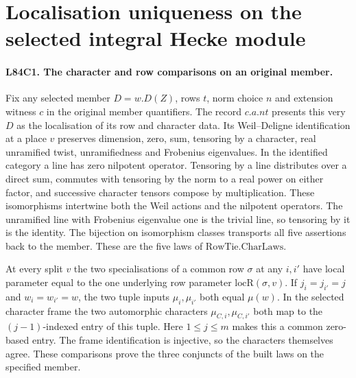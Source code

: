 \section{Localisation uniqueness on the selected integral Hecke module}

\paragraph{L84C1. The character and row comparisons on an original member.}
Fix any selected member $D=w.D(Z)$, rows $t$, norm choice $n$ and
extension witness $c$ in the original member quantifiers.
The record $c.a.nt$ presents this very $D$ as the localisation of its
row and character data. Its Weil--Deligne identification at a place
$v$ preserves dimension, zero, sum, tensoring by a character,
real unramified twist, unramifiedness and Frobenius eigenvalues.
In the identified category a line has zero nilpotent operator.
Tensoring by a line distributes over a direct sum, commutes with
tensoring by the norm to a real power on either factor, and
successive character tensors compose by multiplication.
These isomorphisms intertwine both the Weil actions and the
nilpotent operators. The unramified line with Frobenius eigenvalue
one is the trivial line, so tensoring by it is the identity.
The bijection on isomorphism classes transports all five assertions
back to the member. These are the five laws of
\(\mathrm{RowTie.CharLaws}\).

At every split $v$ the two specialisations of a common row $\sigma$
at any $i,i'$ have local parameter equal to the one underlying
row parameter $\mathrm{locR}(\sigma,v)$. If $j_i=j_{i'}=j$ and
$w_i=w_{i'}=w$, the two tuple inputs $\mu_i,\mu_{i'}$ both equal
$\mu(w)$. In the selected character frame the two automorphic
characters $\mu_{C,i},\mu_{C,i'}$ both map to the $(j-1)$-indexed
entry of this tuple. Here $1\le j\le m$ makes this a common
zero-based entry. The frame identification is injective, so the
characters themselves agree. These comparisons prove the three
conjuncts of the built laws on the specified member.

